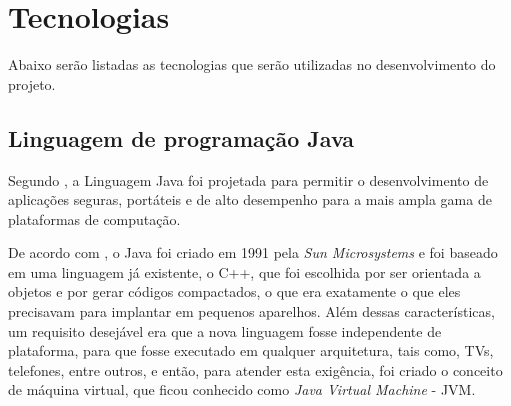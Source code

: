 % 


\section{Tecnologias}

\par Abaixo serão listadas as tecnologias que serão utilizadas no
desenvolvimento do projeto.

\subsection{Linguagem de programação Java}

\par Segundo , a Linguagem Java foi projetada
para permitir o desenvolvimento de aplicações seguras, portáteis
e de alto desempenho para a mais ampla gama de plataformas de computação.

\par De acordo com , o Java foi
criado em 1991 pela \textit{Sun Microsystems} e foi baseado em uma linguagem já
existente, o C++, que foi escolhida por ser orientada a objetos e
por gerar códigos compactados, o que era exatamente o que eles precisavam para
implantar em pequenos aparelhos. Além dessas características, um requisito
desejável era que a nova linguagem fosse independente de plataforma, para que
fosse executado em qualquer arquitetura, tais como, TVs, telefones, entre
outros, e então, para atender esta exigência, foi
criado o conceito de máquina virtual, que ficou conhecido como \textit{Java
Virtual Machine} - JVM\footnotemark[2].

